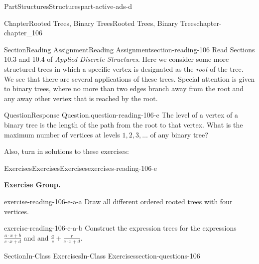 \documentclass[oneside,10pt,]{book}
\numberwithin{equation}{section}
\begin{document}
\begin{partptx}{Part}{Structures}{}{Structures}{}{}{part-active-ads-d}
\begin{chapterptx}{Chapter}{Rooted Trees, Binary Trees}{}{Rooted Trees, Binary Trees}{}{}{chapter-chapter_106}
\typeout{************************************************}
%
\begin{sectionptx}{Section}{Reading Assignment}{}{Reading Assignment}{}{}{section-reading-106}
Read Sections 10.3 and 10.4 of \emph{Applied Discrete Structures}. Here we consider some more structured trees in which a specific vertex is designated as the \emph{root} of the tree.  We see that there are several applications of these trees.  Special attention is given to binary trees, where no more than two edges branch away from the root and any away other vertex that is reached by the root.%
\begin{question}{Question}{Response Question.}{question-reading-106-c}%
The level of a vertex of a binary tree is the length of the path from the root to that vertex.  What is the maximum number of vertices at levels \(1, 2, 3, \dots\) of any binary tree?%
\end{question}
Also, turn in solutions to these exercises:%
%
%
\typeout{************************************************}
\typeout{************************************************}
%
\begin{exercises-subsection-numberless}{Exercises}{Exercises}{}{Exercises}{}{}{exercises-reading-106-e}
\par\medskip\noindent%
\textbf{Exercise Group.}\space\space%
\begin{exercisegroup}
\begin{divisionexerciseeg}{1}{}{}{exercise-reading-106-e-a-a}%
Draw all different ordered rooted trees with four vertices.%
\end{divisionexerciseeg}%
\begin{divisionexerciseeg}{2}{}{}{exercise-reading-106-e-a-b}%
Construct the expression trees for the expressions \(\frac{a\cdot x + b}{c\cdot x + d}\) and and \(\frac{a}{c}+\frac{r}{c\cdot x + d}\).%
\end{divisionexerciseeg}%
\end{exercisegroup}
\par\medskip\noindent
\end{exercises-subsection-numberless}
\end{sectionptx}
%
%
\typeout{************************************************}
\typeout{************************************************}
%
\begin{sectionptx}{Section}{In-Class Exercises}{}{In-Class Exercises}{}{}{section-questions-106}
%

\end{sectionptx}
\end{chapterptx}
\end{partptx}
\end{document}
